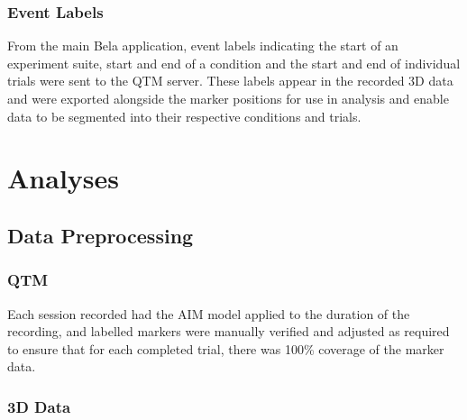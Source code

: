 \documentclass[10pt,a4paper,onecolumn]{article}
\begin{document}
\hypertarget{event-labels}{%
\subsubsection{Event Labels}\label{event-labels}}

From the main Bela application, event labels indicating the start of an experiment suite, start and end of a condition and the start and end of individual trials were sent to the QTM server. These labels appear in the recorded 3D data and were exported alongside the marker positions for use in analysis and enable data to be segmented into their respective conditions and trials.

\hypertarget{analyses}{%
\section{Analyses}\label{analyses}}

\hypertarget{data-preprocessing}{%
\subsection{Data Preprocessing}\label{data-preprocessing}}

\hypertarget{qtm}{%
\subsubsection{QTM}\label{qtm}}

Each session recorded had the AIM model applied to the duration of the recording, and labelled markers were manually verified and adjusted as required to ensure that for each completed trial, there was 100\% coverage of the marker data.

\hypertarget{d-data}{%
\subsubsection{3D Data}\label{d-data}}
\end{document}
